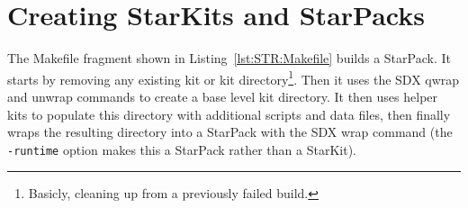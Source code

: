 
\chapter{Creating StarKits and StarPacks}
\label{chapt:StarKitsStarPacks}



The Makefile fragment shown in Listing~\ref{lst:STR:Makefile} builds a
StarPack.  It starts by removing any existing kit or kit
directory\footnote{Basicly, cleaning up from a previously failed
build.}. Then it uses the SDX qwrap and unwrap commands to create a base
level kit directory.  It then uses helper kits to populate this
directory with additional scripts and data files, then finally wraps the
resulting directory into a StarPack with the SDX wrap command (the
\lstinline=-runtime= option makes this a StarPack rather than a
StarKit).

